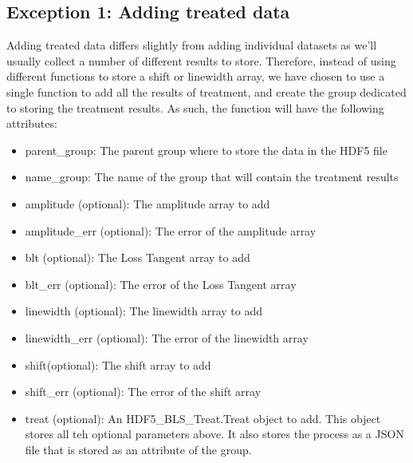 \documentclass[letterpaper,10pt,english]{sphinxmanual}
\begin{document}
\subsection{Exception 1: Adding treated data}
\label{\detokenize{source/hdf5_bls_package:exception-1-adding-treated-data}}
\sphinxAtStartPar
Adding treated data differs slightly from adding individual datasets as we’ll usually collect a number of different results to store. Therefore, instead of using different functions to store a shift or linewidth array, we have chosen to use a single function to add all the results of treatment, and create the group dedicated to storing the treatment results. As such, the function will have the following attributes:
\begin{itemize}
\item {} 
\sphinxAtStartPar
parent\_group: The parent group where to store the data in the HDF5 file

\item {} 
\sphinxAtStartPar
name\_group: The name of the group that will contain the treatment results

\item {} 
\sphinxAtStartPar
amplitude (optional): The amplitude array to add

\item {} 
\sphinxAtStartPar
amplitude\_err (optional): The error of the amplitude array

\item {} 
\sphinxAtStartPar
blt (optional): The Loss Tangent array to add

\item {} 
\sphinxAtStartPar
blt\_err (optional): The error of the Loss Tangent array

\item {} 
\sphinxAtStartPar
linewidth (optional): The linewidth array to add

\item {} 
\sphinxAtStartPar
linewidth\_err (optional): The error of the linewidth array

\item {} 
\sphinxAtStartPar
shift(optional): The shift array to add

\item {} 
\sphinxAtStartPar
shift\_err (optional): The error of the shift array

\item {} 
\sphinxAtStartPar
treat (optional): An HDF5\_BLS\_Treat.Treat object to add. This object stores all teh optional parameters above. It also stores the process as a JSON file that is stored as an attribute of the group.

\end{itemize}
\end{document}
